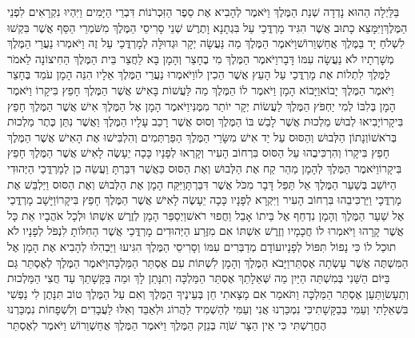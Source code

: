 \documentclass[../main/main.tex]{subfiles}
\begin{document}
\begin{multicols}{\ncols}
בַּלַּיְלָה הַהוּא נָדְדָה שְׁנַת הַמֶּלֶךְ וַיֹּאמֶר לְהָבִיא אֶת סֵפֶר הַזִּכְרֹנוֹת דִּבְרֵי הַיָּמִים וַיִּהְיוּ נִקְרָאִים לִפְנֵי הַמֶּלֶךְ\PreVerseSpace{}וַיִּמָּצֵא כָתוּב אֲשֶׁר הִגִּיד מָרְדֳּכַי עַל בִּגְתָנָא וָתֶרֶשׁ שְׁנֵי סָרִיסֵי הַמֶּלֶךְ מִשֹּׁמְרֵי הַסַּף אֲשֶׁר בִּקְשׁוּ לִשְׁלֹחַ יָד בַּמֶּלֶךְ אֲחַשְׁוֵרוֹשׁ\PreVerseSpace{}וַיֹּאמֶר הַמֶּלֶךְ מַה נַּעֲשָׂה יְקָר וּגְדוּלָּה לְמָרְדֳּכַי עַל זֶה וַיֹּאמְרוּ נַעֲרֵי הַמֶּלֶךְ מְשָׁרְתָיו לֹא נַעֲשָׂה עִמּוֹ דָּבָר\PreVerseSpace{}וַיֹּאמֶר הַמֶּלֶךְ מִי בֶחָצֵר וְהָמָן בָּא לַחֲצַר בֵּית הַמֶּלֶךְ הַחִיצוֹנָה לֵאמֹר לַמֶּלֶךְ לִתְלוֹת אֶת מָרְדֳּכַי עַל הָעֵץ אֲשֶׁר הֵכִין לוֹ\PreVerseSpace{}וַיֹּאמְרוּ נַעֲרֵי הַמֶּלֶךְ אֵלָיו הִנֵּה הָמָן עֹמֵד בֶּחָצֵר וַיֹּאמֶר הַמֶּלֶךְ יָבוֹא\PreVerseSpace{}וַיָּבוֹא הָמָן וַיֹּאמֶר לוֹ הַמֶּלֶךְ מַה לַּעֲשׁוֹת בָּאִישׁ אֲשֶׁר הַמֶּלֶךְ חָפֵץ בִּיקָרוֹ וַיֹּאמֶר הָמָן בְּלִבּוֹ לְמִי יַחְפֹּץ הַמֶּלֶךְ לַעֲשׂוֹת יְקָר יוֹתֵר מִמֶּנִּי\PreVerseSpace{}וַיֹּאמֶר הָמָן אֶל הַמֶּלֶךְ אִישׁ אֲשֶׁר הַמֶּלֶךְ חָפֵץ בִּיקָרוֹ\PreVerseSpace{}יָבִיאוּ לְבוּשׁ מַלְכוּת אֲשֶׁר לָבַשׁ בּוֹ הַמֶּלֶךְ וְסוּס אֲשֶׁר רָכַב עָלָיו הַמֶּלֶךְ וַאֲשֶׁר נִתַּן כֶּתֶר מַלְכוּת בְּרֹאשׁוֹ\PreVerseSpace{}וְנָתוֹן הַלְּבוּשׁ וְהַסּוּס עַל יַד אִישׁ מִשָּׂרֵי הַמֶּלֶךְ הַפַּרְתְּמִים וְהִלְבִּישׁוּ אֶת הָאִישׁ אֲשֶׁר הַמֶּלֶךְ חָפֵץ בִּיקָרוֹ וְהִרְכִּיבֻהוּ עַל הַסּוּס בִּרְחוֹב הָעִיר וְקָרְאוּ לְפָנָיו כָּכָה יֵעָשֶׂה לָאִישׁ אֲשֶׁר הַמֶּלֶךְ חָפֵץ בִּיקָרוֹ\PreVerseSpace{}וַיֹּאמֶר הַמֶּלֶךְ לְהָמָן מַהֵר קַח אֶת הַלְּבוּשׁ וְאֶת הַסּוּס כַּאֲשֶׁר דִּבַּרְתָּ וַעֲשֵׂה כֵן לְמָרְדֳּכַי הַיְּהוּדִי הַיּוֹשֵׁב בְּשַׁעַר הַמֶּלֶךְ אַל תַּפֵּל דָּבָר מִכֹּל אֲשֶׁר דִּבַּרְתָּ\PreVerseSpace{}וַיִּקַּח הָמָן אֶת הַלְּבוּשׁ וְאֶת הַסּוּס וַיַּלְבֵּשׁ אֶת מָרְדֳּכָי וַיַּרְכִּיבֵהוּ בִּרְחוֹב הָעִיר וַיִּקְרָא לְפָנָיו כָּכָה יֵעָשֶׂה לָאִישׁ אֲשֶׁר הַמֶּלֶךְ חָפֵץ בִּיקָרוֹ\PreVerseSpace{}וַיָּשָׁב מָרְדֳּכַי אֶל שַׁעַר הַמֶּלֶךְ וְהָמָן נִדְחַף אֶל בֵּיתוֹ אָבֵל וַחֲפוּי רֹאשׁ\PreVerseSpace{}וַיְסַפֵּר הָמָן לְזֶרֶשׁ אִשְׁתּוֹ וּלְכָל אֹהֲבָיו אֵת כָּל אֲשֶׁר קָרָהוּ וַיֹּאמְרוּ לוֹ חֲכָמָיו וְזֶרֶשׁ אִשְׁתּוֹ אִם מִזֶּרַע הַיְּהוּדִים מָרְדֳּכַי אֲשֶׁר הַחִלּוֹתָ לִנְפֹּל לְפָנָיו לֹא תוּכַל לוֹ כִּי נָפוֹל תִּפּוֹל לְפָנָיו\PreVerseSpace{}עוֹדָם מְדַבְּרִים עִמּוֹ וְסָרִיסֵי הַמֶּלֶךְ הִגִּיעוּ וַיַּבְהִלוּ לְהָבִיא אֶת הָמָן אֶל הַמִּשְׁתֶּה אֲשֶׁר עָשְׂתָה אֶסְתֵּר\PreChapterSpace{}וַיָּבֹא הַמֶּלֶךְ וְהָמָן לִשְׁתּוֹת עִם אֶסְתֵּר הַמַּלְכָּה\PreVerseSpace{}וַיֹּאמֶר הַמֶּלֶךְ לְאֶסְתֵּר גַּם בַּיּוֹם הַשֵּׁנִי בְּמִשְׁתֵּה הַיַּיִן מַה שְּׁאֵלָתֵךְ אֶסְתֵּר הַמַּלְכָּה וְתִנָּתֵן לָךְ וּמַה בַּקָּשָׁתֵךְ עַד חֲצִי הַמַּלְכוּת וְתֵעָשׂ\PreVerseSpace{}וַתַּעַן אֶסְתֵּר הַמַּלְכָּה וַתֹּאמַר אִם מָצָאתִי חֵן בְּעֵינֶיךָ הַמֶּלֶךְ וְאִם עַל הַמֶּלֶךְ טוֹב תִּנָּתֶן לִי נַפְשִׁי בִּשְׁאֵלָתִי וְעַמִּי בְּבַקָּשָׁתִי\PreVerseSpace{}כִּי נִמְכַּרְנוּ אֲנִי וְעַמִּי לְהַשְׁמִיד לַהֲרוֹג וּלְאַבֵּד וְאִלּוּ לַעֲבָדִים וְלִשְׁפָחוֹת נִמְכַּרְנוּ הֶחֱרַשְׁתִּי כִּי אֵין הַצָּר שֹׁוֶה בְּנֵזֶק הַמֶּלֶךְ \ClosedSection{}וַיֹּאמֶר הַמֶּלֶךְ אֲחַשְׁוֵרוֹשׁ וַיֹּאמֶר לְאֶסְתֵּר 
\end{multicols}
\end{document}

